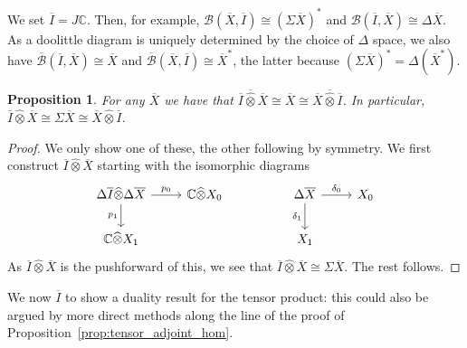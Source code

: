 \documentclass[a4paper,11pt]{article}
\theoremstyle{plain}
\newtheorem{proposition}{Proposition}[section]
\theoremstyle{remark}
\newcommand{\mc}[1]{\mathcal{#1}}
\newcommand{\proten}{\widehat\otimes}
\begin{document}
We set $\overline I = J\mathbb C$.  Then, for example, $\mc B(\overline X,\overline I) \cong(\Sigma\overline X)^*$ and $\mc B(\overline I, \overline X) \cong \Delta\overline X$.  As a doolittle diagram is uniquely determined by the choice of $\Delta$ space, we also have $\overline{\mc B}(\overline I, \overline X) \cong \overline X$ and $\overline{\mc B}(\overline X,\overline I) \cong \overline X^*$, the latter because $(\Sigma\overline X)^* = \Delta(\overline X^*)$.

\begin{proposition}\label{prop:tensor_unit}
For any $\overline X$ we have that $\overline I \overline\proten \overline X \cong \overline X \cong \overline X \overline\proten \overline I$.  In particular, $\overline I \proten \overline X \cong \Sigma \overline X \cong \overline X \proten \overline I$.
\end{proposition}
\begin{proof}
We only show one of these, the other following by symmetry.  We first construct $\overline I \proten \overline X$ starting with the isomorphic diagrams
\[ \begin{tikzcd}
\Delta\overline I \proten \Delta\overline X \arrow[r, "p_0"] \arrow[d, "p_1"'] & \mathbb C \proten X_0  & &
\Delta\overline X \arrow[r, "\delta_0"] \arrow[d, "\delta_1"']  & X_0
\\
\mathbb C\proten X_1  & & &  X_1
\end{tikzcd} \]
As $\overline I \proten \overline X$ is the pushforward of this, we see that $\overline I \proten \overline X \cong \Sigma\overline X$.  The rest follows.
\end{proof}

We now $\overline I$ to show a duality result for the tensor product: this could also be argued by more direct methods along the line of the proof of Proposition~\ref{prop:tensor_adjoint_hom}.
\end{document}

